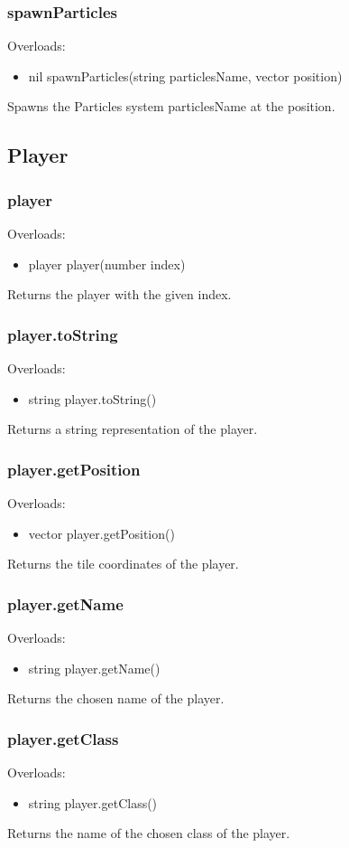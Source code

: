 \documentclass{book}
\newenvironment{ulist}
	{\begin{itemize}
			\itemsep0em}
	{\end{itemize}}
\begin{document}
\subsubsection{spawnParticles}
Overloads:
\begin{ulist}
	\item nil spawnParticles(string particlesName, vector position)
\end{ulist}
Spawns the Particles system particlesName at the position.

\subsection{Player}
\subsubsection{player}
Overloads:
\begin{ulist}
	\item player player(number index)
\end{ulist}
Returns the player with the given index.

\subsubsection{player.toString}
Overloads:
\begin{ulist}
	\item string player.toString()
\end{ulist}
Returns a string representation of the player.

\subsubsection{player.getPosition}
Overloads:
\begin{ulist}
	\item vector player.getPosition()
\end{ulist}
Returns the tile coordinates of the player.

\subsubsection{player.getName}
Overloads:
\begin{ulist}
	\item string player.getName()
\end{ulist}
Returns the chosen name of the player.

\subsubsection{player.getClass}
Overloads:
\begin{ulist}
	\item string player.getClass()
\end{ulist}
Returns the name of the chosen class of the player.
\end{document}
